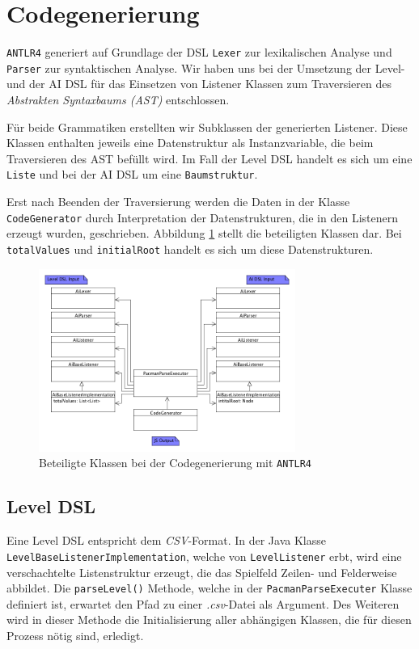 \documentclass[conference]{IEEEtran}
\begin{document}
\section{Codegenerierung}
\texttt{ANTLR4} generiert auf Grundlage der DSL \texttt{Lexer} zur lexikalischen Analyse und \texttt{Parser} zur syntaktischen Analyse.
Wir haben uns bei der Umsetzung der Level- und der AI DSL für  das Einsetzen von Listener Klassen zum Traversieren des \emph{Abstrakten Syntaxbaums (AST)} entschlossen.

Für beide Grammatiken erstellten wir Subklassen der generierten Listener. Diese Klassen enthalten jeweils eine Datenstruktur als Instanzvariable, die beim Traversieren des AST befüllt wird. Im Fall der Level DSL handelt es sich um eine \texttt{Liste} und bei der AI DSL um eine \texttt{Baumstruktur}.

Erst nach Beenden der Traversierung werden die Daten in der Klasse \texttt{CodeGenerator} durch Interpretation der Datenstrukturen, die in den Listenern erzeugt wurden, geschrieben. Abbildung \ref{antlr_classes} stellt die beteiligten Klassen dar. Bei \texttt{totalValues} und \texttt{initialRoot} handelt es sich um diese Datenstrukturen.

\begin{figure}[!htb]
\centering
\includegraphics[width=3.3in]{code_gen_rough.png}

\caption{Beteiligte Klassen bei der Codegenerierung mit \texttt{ANTLR4}}
\label{antlr_classes}
\end{figure}

\subsection{Level DSL}
Eine Level DSL entspricht dem \emph{CSV}-Format. In der Java Klasse \texttt{LevelBaseListenerImplementation}, welche von \texttt{LevelListener} erbt, wird eine verschachtelte Listenstruktur erzeugt, die das Spielfeld Zeilen- und Felderweise abbildet. Die \texttt{parseLevel()} Methode, welche in der \texttt{PacmanParseExecuter} Klasse definiert ist, erwartet den Pfad zu einer \emph{.csv}-Datei als Argument. Des Weiteren wird in dieser Methode die Initialisierung aller abhängigen Klassen, die für diesen Prozess nötig sind, erledigt.
\end{document}
